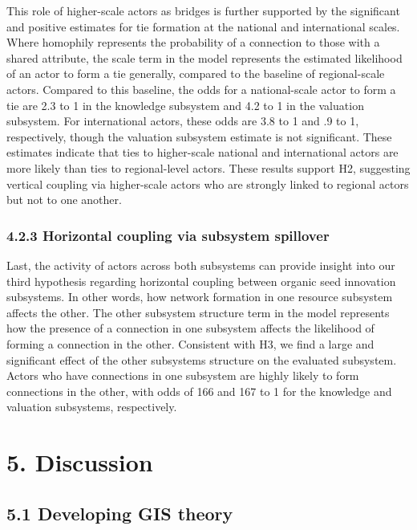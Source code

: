 \documentclass[twoside,12pt,final]{ucthesis-CA2012}
\begin{document}
\begin{ucmainmatter}
This role of higher-scale actors as bridges is further supported by the
significant and positive estimates for tie formation at the national and
international scales. Where homophily represents the probability of a
connection to those with a shared attribute, the \textquotesingle scale\textquotesingle{} term in the
model represents the estimated likelihood of an actor to form a tie
generally, compared to the baseline of regional-scale actors. Compared
to this baseline, the odds for a national-scale actor to form a tie are
2.3 to 1 in the knowledge subsystem and 4.2 to 1 in the valuation
subsystem. For international actors, these odds are 3.8 to 1 and .9 to
1, respectively, though the valuation subsystem estimate is not
significant. These estimates indicate that ties to higher-scale national
and international actors are more likely than ties to regional-level
actors. These results support H2, suggesting vertical coupling via
higher-scale actors who are strongly linked to regional actors but not
to one another.

\hypertarget{horizontal-coupling-via-subsystem-spillover}{%
\subsubsection{4.2.3 Horizontal coupling via subsystem spillover}\label{horizontal-coupling-via-subsystem-spillover}}

Last, the activity of actors across both subsystems can provide insight
into our third hypothesis regarding horizontal coupling between organic
seed innovation subsystems. In other words, how network formation in one
resource subsystem affects the other. The \textquotesingle other subsystem structure\textquotesingle{}
term in the model represents how the presence of a connection in one
subsystem affects the likelihood of forming a connection in the other.
Consistent with H3, we find a large and significant effect of the other
subsystems\textquotesingle{} structure on the evaluated subsystem. Actors who have
connections in one subsystem are highly likely to form connections in
the other, with odds of 166 and 167 to 1 for the knowledge and valuation
subsystems, respectively.

\hypertarget{discussion}{%
\section{5. Discussion}\label{discussion}}

\hypertarget{developing-gis-theory}{%
\subsection{5.1 Developing GIS theory}\label{developing-gis-theory}}


\end{ucmainmatter}
\end{document}
